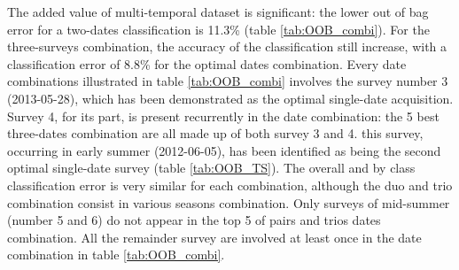 \documentclass[remotesensing,article,submit,moreauthors,pdftex,12pt,a4paper]{mdpi} %
\begin{document}
The added value of multi-temporal dataset is significant: the lower out of bag error for a two-dates classification is 11.3\% (table \ref{tab:OOB_combi}). For the three-surveys combination, the accuracy of the classification still increase, with a classification error of 8.8\% for the optimal dates combination.
Every date combinations illustrated in table \ref{tab:OOB_combi} involves the survey number 3 (2013-05-28), which has been demonstrated as the optimal single-date acquisition.  
Survey 4, for its part, is present recurrently in the date combination: the 5 best three-dates combination are all made up of both survey 3 and 4. 
this survey, occurring in early summer (2012-06-05), has been identified as being the second optimal single-date survey (table \ref{tab:OOB_TS}). 
The overall and by class classification error is very similar for each combination, although the duo and trio combination consist in various seasons combination. 
Only surveys of mid-summer (number 5 and 6) do not appear in the top 5 of pairs and trios dates combination. All the remainder survey are involved at least once in the date combination in table \ref{tab:OOB_combi}.
\end{document}
